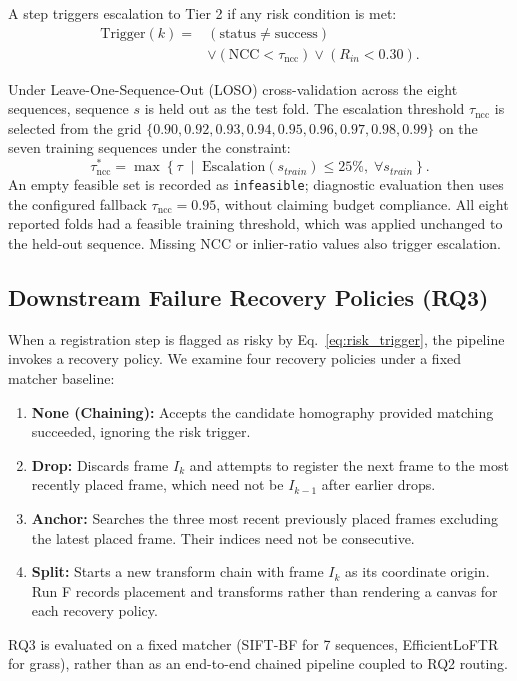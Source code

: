 \documentclass[conference]{IEEEtran}
\begin{document}
A step triggers escalation to Tier 2 if any risk condition is met:
\begin{equation}
\begin{aligned}
\text{Trigger}(k)={}&(\text{status}\neq\text{success})\\
 &\lor(\text{NCC}<\tau_{\mathrm{ncc}})\lor(R_{in}<0.30).
\end{aligned}
\label{eq:risk_trigger}
\end{equation}

Under Leave-One-Sequence-Out (LOSO) cross-validation across the eight sequences, sequence $s$ is held out as the test fold. The escalation threshold $\tau_{\mathrm{ncc}}$ is selected from the grid $\{0.90, 0.92, 0.93, 0.94, 0.95, 0.96, 0.97, 0.98, 0.99\}$ on the seven training sequences under the constraint:
\begin{equation}
\tau_{\mathrm{ncc}}^* = \max \left\{ \tau \;\middle|\; \text{Escalation}(s_{train}) \le 25\%, \; \forall s_{train} \right\}.
\label{eq:loso_budget}
\end{equation}
An empty feasible set is recorded as \texttt{infeasible}; diagnostic evaluation then uses the configured fallback $\tau_{\mathrm{ncc}}=0.95$, without claiming budget compliance. All eight reported folds had a feasible training threshold, which was applied unchanged to the held-out sequence. Missing NCC or inlier-ratio values also trigger escalation.

\subsection{Downstream Failure Recovery Policies (RQ3)}
\label{subsec:recovery_method}

When a registration step is flagged as risky by Eq.~\eqref{eq:risk_trigger}, the pipeline invokes a recovery policy. We examine four recovery policies under a fixed matcher baseline:
\begin{enumerate}
    \item \textbf{None (Chaining):} Accepts the candidate homography provided matching succeeded, ignoring the risk trigger.
    \item \textbf{Drop:} Discards frame $I_k$ and attempts to register the next frame to the most recently placed frame, which need not be $I_{k-1}$ after earlier drops.
    \item \textbf{Anchor:} Searches the three most recent previously placed frames excluding the latest placed frame. Their indices need not be consecutive.
    \item \textbf{Split:} Starts a new transform chain with frame $I_k$ as its coordinate origin. Run F records placement and transforms rather than rendering a canvas for each recovery policy.
\end{enumerate}
RQ3 is evaluated on a fixed matcher (SIFT-BF for 7 sequences, EfficientLoFTR for grass), rather than as an end-to-end chained pipeline coupled to RQ2 routing.
\end{document}
